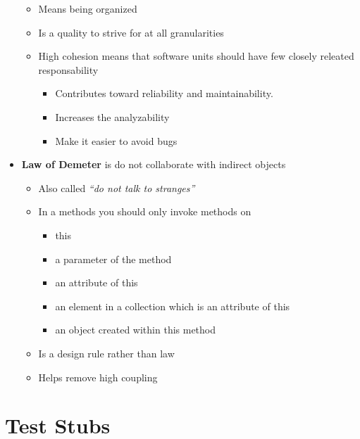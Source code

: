 \documentclass[11pt]{article}
\providecommand{\tightlist}{%
      \setlength{\itemsep}{0pt}\setlength{\parskip}{0pt}}
\begin{document}
\begin{itemize}
  \begin{itemize}
  \tightlist
  \item
    Means being organized
  \item
    Is a quality to strive for at all granularities
  \item
    High cohesion means that software units should have few closely
    releated responsability

    \begin{itemize}
    \tightlist
    \item
      Contributes toward reliability and maintainability.
    \item
      Increases the analyzability
    \item
      Make it easier to avoid bugs
    \end{itemize}
  \end{itemize}
\item
  \textbf{Law of Demeter} is do not collaborate with indirect objects

  \begin{itemize}
  \tightlist
  \item
    Also called \emph{``do not talk to stranges''}
  \item
    In a methods you should only invoke methods on

    \begin{itemize}
    \tightlist
    \item
      this
    \item
      a parameter of the method
    \item
      an attribute of this
    \item
      an element in a collection which is an attribute of this
    \item
      an object created within this method
    \end{itemize}
  \item
    Is a design rule rather than law
  \item
    Helps remove high coupling
  \end{itemize}
\end{itemize}

    \hypertarget{test-stubs}{%
\section{Test Stubs}\label{test-stubs}}
\end{document}
